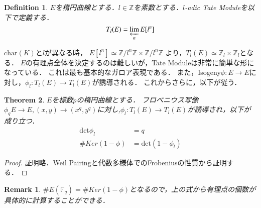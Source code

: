 \documentclass{ujarticle}
\newtheorem{thm}{Theorem}[section]
\newtheorem{dfn}[thm]{Definition}
\newtheorem*{rem}{Remark}
\begin{document}
\begin{dfn}
 $E$を楕円曲線とする．$l \in \mathbb{Z}$を素数とする．$l$-adic Tate Moduleを以下で定義する．
 \begin{equation*}
  T_l(E)= \varprojlim_{n}E[l^n]
 \end{equation*}
\end{dfn}
$\mathrm{char}(K)$と$l$が異なる時，
$E[l^n] \simeq \mathbb{Z}/l^n \mathbb{Z} \times \mathbb{Z}/l^n \mathbb{Z} $
より，$T_l(E)\simeq \mathbb{Z}_l \times \mathbb{Z}_l$となる．
$E$の有理点全体を決定するのは難しいが，Tate Moduleは非常に簡単な形になっている．
これは最も基本的なガロア表現である．
また，Isogeny$\phi:E \to E$に対し，$\phi_l:T_l(E) \to T_l(E)$が誘導される．
これからさらに，以下が従う．
\begin{thm}
  $E$を標数$p$の楕円曲線とする．
  フロベニウス写像$\phi_q E \to E,(x,y) \to (x^q,y^q)$に対し,$\phi_l: T_l(E) \to T_l(E)$が誘導され，以下が成り立つ．
  \begin{align}
   \mathrm{det}\phi_l  &= q \\
   \#Ker(1 - \phi) &= \mathrm{det}(1 - \phi_l)
 \end{align}
\end{thm}
\begin{proof}
 証明略．Weil Pairingと代数多様体でのFrobeniusの性質から証明する．
\end{proof}
\begin{rem}
 $\#E(\mathbb{F}_q)=\#Ker(1 - \phi)$となるので，上の式から有理点の個数が具体的に計算することができる．
\end{rem}
\end{document}
